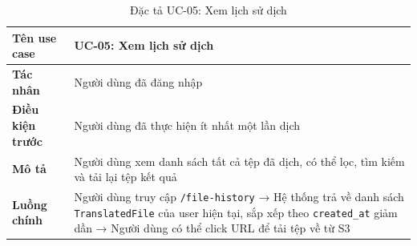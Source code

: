 \begin{table}[H]
\centering
\caption{Đặc tả UC-05: Xem lịch sử dịch}
\renewcommand{\arraystretch}{1.3}
\begin{tabularx}{\textwidth}{|l|X|}
\hline
\textbf{Tên use case}    & UC-05: Xem lịch sử dịch \\
\hline
\textbf{Tác nhân}        & Người dùng đã đăng nhập \\
\hline
\textbf{Điều kiện trước} & Người dùng đã thực hiện ít nhất một lần dịch \\
\hline
\textbf{Mô tả}           & Người dùng xem danh sách tất cả tệp đã dịch, có thể lọc, tìm kiếm
                           và tải lại tệp kết quả \\
\hline
\textbf{Luồng chính}     & Người dùng truy cập \texttt{/file-history} → Hệ thống trả về danh
                           sách \texttt{TranslatedFile} của user hiện tại, sắp xếp theo
                           \texttt{created\_at} giảm dần → Người dùng có thể click URL để
                           tải tệp về từ S3 \\
\hline
\end{tabularx}
\end{table}
